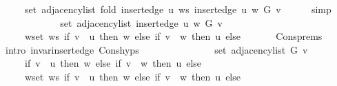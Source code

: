 \begin{isabellebody}
\ \ \ \ \ set\ {\isacharparenleft}{\kern0pt}adjacency{\isacharunderscore}{\kern0pt}list\ {\isacharparenleft}{\kern0pt}fold\ {\isacharparenleft}{\kern0pt}insert{\isacharunderscore}{\kern0pt}edge\ u{\isacharparenright}{\kern0pt}\ ws\ {\isacharparenleft}{\kern0pt}insert{\isacharunderscore}{\kern0pt}edge\ u\ w\ G{\isacharparenright}{\kern0pt}{\isacharparenright}{\kern0pt}\ v{\isacharparenright}{\kern0pt}{\isachardoublequoteclose}\isanewline
\ \ \ \ \isamarkupfalse%
\ simp\isanewline
\ \ \isamarkupfalse%
\ \isamarkupfalse%
\isanewline
\ \ \ \ {\isachardoublequoteopen}{\isachardot}{\kern0pt}{\isachardot}{\kern0pt}{\isachardot}{\kern0pt}\ {\isacharequal}{\kern0pt}\isanewline
\ \ \ \ \ set\ {\isacharparenleft}{\kern0pt}adjacency{\isacharunderscore}{\kern0pt}list\ {\isacharparenleft}{\kern0pt}insert{\isacharunderscore}{\kern0pt}edge\ u\ w\ G{\isacharparenright}{\kern0pt}\ v{\isacharparenright}{\kern0pt}\ {\isasymunion}\isanewline
\ \ \ \ \ {\isacharparenleft}{\kern0pt}{\isasymUnion}w{\isasymin}set\ ws{\isachardot}{\kern0pt}\ if\ v\ {\isacharequal}{\kern0pt}\ u\ then\ {\isacharbraceleft}{\kern0pt}w{\isacharbraceright}{\kern0pt}\ else\ if\ v\ {\isacharequal}{\kern0pt}\ w\ then\ {\isacharbraceleft}{\kern0pt}u{\isacharbraceright}{\kern0pt}\ else\ {\isacharbraceleft}{\kern0pt}{\isacharbraceright}{\kern0pt}{\isacharparenright}{\kern0pt}{\isachardoublequoteclose}\isanewline
\ \ \ \ \isamarkupfalse%
\ Cons{\isachardot}{\kern0pt}prems\isanewline
\ \ \ \ \isamarkupfalse%
\ {\isacharparenleft}{\kern0pt}intro\ invar{\isacharunderscore}{\kern0pt}insert{\isacharunderscore}{\kern0pt}edge\ Cons{\isachardot}{\kern0pt}hyps{\isacharparenright}{\kern0pt}\isanewline
\ \ \isamarkupfalse%
\ \isamarkupfalse%
\isanewline
\ \ \ \ {\isachardoublequoteopen}{\isachardot}{\kern0pt}{\isachardot}{\kern0pt}{\isachardot}{\kern0pt}\ {\isacharequal}{\kern0pt}\isanewline
\ \ \ \ \ set\ {\isacharparenleft}{\kern0pt}adjacency{\isacharunderscore}{\kern0pt}list\ G\ v{\isacharparenright}{\kern0pt}\ {\isasymunion}\isanewline
\ \ \ \ \ {\isacharparenleft}{\kern0pt}if\ v\ {\isacharequal}{\kern0pt}\ u\ then\ {\isacharbraceleft}{\kern0pt}w{\isacharbraceright}{\kern0pt}\ else\ if\ v\ {\isacharequal}{\kern0pt}\ w\ then\ {\isacharbraceleft}{\kern0pt}u{\isacharbraceright}{\kern0pt}\ else\ {\isacharbraceleft}{\kern0pt}{\isacharbraceright}{\kern0pt}{\isacharparenright}{\kern0pt}\ {\isasymunion}\isanewline
\ \ \ \ \ {\isacharparenleft}{\kern0pt}{\isasymUnion}w{\isasymin}set\ ws{\isachardot}{\kern0pt}\ if\ v\ {\isacharequal}{\kern0pt}\ u\ then\ {\isacharbraceleft}{\kern0pt}w{\isacharbraceright}{\kern0pt}\ else\ if\ v\ {\isacharequal}{\kern0pt}\ w\ then\ {\isacharbraceleft}{\kern0pt}u{\isacharbraceright}{\kern0pt}\ else\ {\isacharbraceleft}{\kern0pt}{\isacharbraceright}{\kern0pt}{\isacharparenright}{\kern0pt}{\isachardoublequoteclose}\isanewline

\end{isabellebody}
